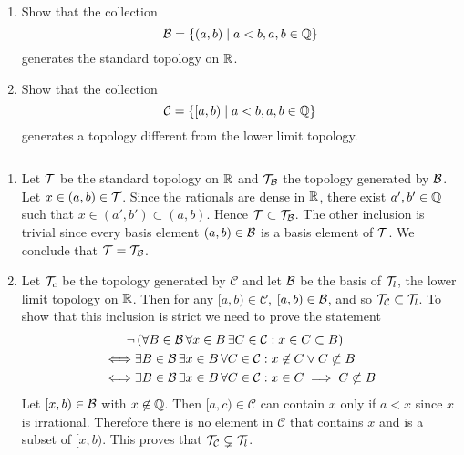 \begin{ex}{13.8}
    ${}$
    \begin{enumerate}
        \item Show that the collection 
        $$
            \mathcal{B}=\left\{(a,b)\mid a<b, a,b\in\mathbb{Q} \right\} 
        $$
        generates the standard topology on $\mathbb{R}$.
    
        \item Show that the collection
        $$
            \mathcal{C}=\left\{[a,b)\mid a<b, a,b\in\mathbb{Q}\right\} 
        $$
        generates a topology different from the lower limit topology.
    \end{enumerate}
\end{ex}
\begin{sol}
    ${}$
    \begin{enumerate}
        \item Let $\mathcal{T}$ be the standard topology on $\mathbb{R}$ and $\mathcal{T}_{\mathcal{B}}$ the topology generated by $\mathcal{B}$. 
        Let $x\in(a,b)\in\mathcal{T}$. Since the rationals are dense in $\mathbb{R}$, there exist $a', b'\in\mathbb{Q}$ such that $x\in(a',b')\subset(a,b)$. 
        Hence $\mathcal{T}\subset\mathcal{T}_{\mathcal{B}}$. The other inclusion is trivial since every basis element $(a,b)\in\mathcal{B}$ is a basis element of $\mathcal{T}$. We conclude that $\mathcal{T}=\mathcal{T}_{\mathcal{B}}$.

        \item Let $\mathcal{T}_c$ be the topology generated by $\mathcal{C}$ and let $\mathcal{B}$ be the basis of $\mathcal{T}_l$, the lower limit topology on $\mathbb{R}$. 
        Then for any $[a,b)\in\mathcal{C}$, $[a,b)\in\mathcal{B}$, and so $\mathcal{T}_\mathcal{C}\subset\mathcal{T}_l$. To show that this inclusion is strict we need to prove the statement
        \begin{align*}
            \lnot&\left(\forall B\in\mathcal{B}\,\forall x\in B\,\exists C\in\mathcal{C}: x\in C\subset B\right)\\
            \iff&\exists B\in\mathcal{B}\, \exists x\in B\,\forall C\in\mathcal{C}:x\not\in C\vee C\not\subset B\\
            \iff&\exists B\in\mathcal{B}\, \exists x\in B\,\forall C\in\mathcal{C}:x\in C\implies C\not\subset B
        \end{align*}
        Let $[x,b)\in\mathcal{B}$ with $x\not\in\mathbb{Q}$. Then $[a,c)\in\mathcal{C}$ can contain $x$ only if $a<x$ since $x$ is irrational. Therefore there is no element in $\mathcal{C}$ that contains $x$ and is a subset of $[x,b)$.
        This proves that $\mathcal{T}_\mathcal{C}\subsetneq\mathcal{T}_l$.
    \end{enumerate}
\end{sol}

